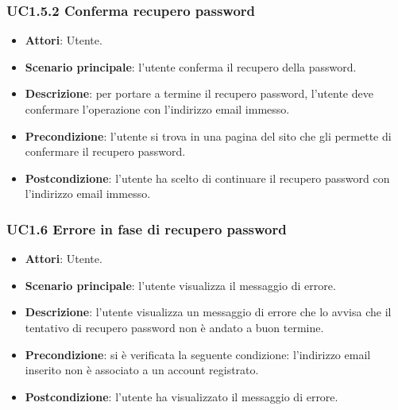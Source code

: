 \subsubsection{UC1.5.2 Conferma recupero password}
\begin{itemize}
\item \textbf{Attori}: Utente.
\item \textbf{Scenario principale}: l'utente conferma il recupero della password.
\item \textbf{Descrizione}: per portare a termine il recupero password, l'utente deve confermare l'operazione con l'indirizzo email immesso.
\item \textbf{Precondizione}: l'utente si trova in una pagina del sito  che gli permette di confermare il recupero password.
\item \textbf{Postcondizione}: l'utente ha scelto di continuare il recupero password con l'indirizzo email immesso.
\end{itemize}
\subsubsection{UC1.6 Errore in fase di recupero password}
\begin{itemize}
\item \textbf{Attori}: Utente.
\item \textbf{Scenario principale}: l'utente visualizza il messaggio di errore.
\item \textbf{Descrizione}: l'utente visualizza un messaggio di errore che lo avvisa che il tentativo di recupero password non è andato a buon termine.
\item \textbf{Precondizione}: si è verificata la seguente condizione: l'indirizzo email inserito non è associato a un account registrato.
\item \textbf{Postcondizione}: l'utente ha visualizzato il messaggio di errore.
\end{itemize}
